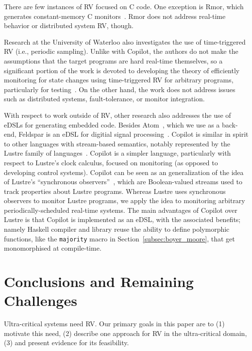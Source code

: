 There are few instances of RV focused on C code.  One exception is {\sc
  Rmor}, which generates constant-memory C monitors~\cite{havelundc}.  {\sc
  Rmor} does not address real-time behavior or distributed system RV, though.


Research at the University of Waterloo also investigates the use of
time-triggered RV (i.e., periodic sampling).  Unlike with Copilot, the authors
do not make the assumptions that the target programs are hard real-time
themselves, so a significant portion of the work is devoted to developing the
theory of efficiently monitoring for state changes using time-triggered RV for
arbitrary programs, particularly for testing~\cite{sampling,borzoo}.  On the
other hand, the work does not address issues such as distributed systems,
fault-tolerance, or monitor integration.

With respect to work outside of RV, other research also addresses the use of
eDSLs for generating embedded code.  Besides Atom~\cite{atom}, which we use as a
back-end, Feldspar is an eDSL for digitial signal processing~\cite{feldspar}.
Copilot is similar in spirit to other languages with stream-based semantics,
notably represented by the Lustre family of languages~\cite{lustre-intro}.
Copilot is a simpler language, particularly with respect to Lustre's clock
calculus, focused on monitoring (as opposed to developing control systems).
Copilot can be seen as an generalization of the idea of Lustre's ``synchronous
observers''~\cite{lustre}, which are Boolean-valued streams used to track
properties about Lustre programs.  Whereas Lustre uses synchronous observers to
monitor Lustre programs, we apply the idea to monitoring arbitrary
periodically-scheduled real-time systems.  The main advantages of Copilot over
Lustre is that Copilot is implemented as an eDSL, with the associated benefits;
namely Haskell compiler and library reuse the ability to define polymorphic
functions, like the {\tt majority} macro in Section~\ref{subsec:boyer_moore}, that get
monomorphised at compile-time.


\section{Conclusions and Remaining Challenges}
\label{sec:conclusions}
Ultra-critical systems need RV.  Our primary goals in this paper are to (1)
motivate this need, (2) describe one approach for RV in the ultra-critical
domain, (3) and present evidence for its feasibility.

